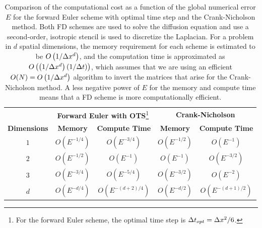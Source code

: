 \documentclass[oneeqnum,onefignum,onetabnum,onethmnum]{siamltex}
\begin{document}
\begin{table}[tbh]
\caption{\label{tab:comp_perf_vs_dim}
   Comparison of the computational cost as a function of the global numerical 
   error $E$ for the forward Euler scheme with optimal time step and the 
   Crank-Nicholson method.  Both FD schemes are used to solve the diffusion 
   equation and use a second-order, isotropic stencil is used to discretize 
   the Laplacian.  For a problem in $d$ spatial dimensions, the memory 
   requirement for each scheme is estimated to be $O \left(1/\Delta x^d \right)$, 
   and the computation time is approximated as 
   $O\left( \left(1/\Delta x^d \right) (1/\Delta t) \right)$, which assumes that we 
   are using an efficient $O(N) = O \left( 1/\Delta x^d \right)$ algorithm to 
   invert the matrices that arise for the Crank-Nicholson method.
   A less negative power of $E$ for the memory and compute time
   means that a FD scheme is more computationally efficient.
}
\begin{minipage}{\textwidth}
\begin{center} \footnotesize
\renewcommand{\arraystretch}{1.5}
\begin{tabular}{|c|c|c|c|c|}
  \hline
  & \multicolumn{2}{|c|}{{\bf Forward Euler with OTS}\footnote{For the forward 
    Euler scheme, the optimal time step is $\Delta t_{opt} = \Delta x^2/6$.}}
  & \multicolumn{2}{|c|}{\bf Crank-Nicholson} \\
  \cline{2-3} \cline{4-5} 
    {\bf Dimensions} & {\bf Memory} & {\bf Compute Time} 
  & {\bf Memory} & {\bf Compute Time} \\
  \hline 
  $1$ & $O\left( E^{-1/4} \right)$ 
      & $O\left( E^{-3/4} \right)$ 
      & $O\left( E^{-1/2} \right)$ 
      & $O\left( E^{-1} \right)$ \\ 
  $2$ & $O\left( E^{-1/2} \right)$ 
      & $O\left( E^{-1} \right)$ 
      & $O\left( E^{-1} \right)$ 
      & $O\left( E^{-3/2} \right)$ \\ 
  $3$ & $O\left( E^{-3/4} \right)$ 
      & $O\left( E^{-5/4} \right)$ 
      & $O\left( E^{-3/2} \right)$ 
      & $O\left( E^{-2} \right)$ \\
  $d$ & $O\left( E^{-d/4} \right)$ 
      & $O\left( E^{-(d+2)/4} \right)$ 
      & $O\left( E^{-d/2} \right)$ 
      & $O\left( E^{-(d+1)/2} \right)$ \\ 
  \hline 
\end{tabular}
\end{center}
\end{minipage}
\end{table}
\end{document}
